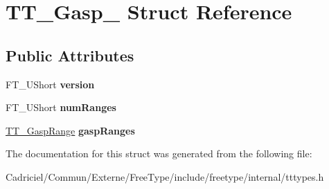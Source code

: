 \hypertarget{struct_t_t___gasp__}{\section{T\-T\-\_\-\-Gasp\-\_\- Struct Reference}
\label{struct_t_t___gasp__}
}
\subsection*{Public Attributes}
\begin{DoxyCompactItemize}
\item 
\hypertarget{struct_t_t___gasp___a0166777999a11a32068418ed6cf0caf8}{F\-T\-\_\-\-U\-Short {\bfseries version}}\label{struct_t_t___gasp___a0166777999a11a32068418ed6cf0caf8}

\item 
\hypertarget{struct_t_t___gasp___a03f6dc693ebee0fedc055ac0981ee776}{F\-T\-\_\-\-U\-Short {\bfseries num\-Ranges}}\label{struct_t_t___gasp___a03f6dc693ebee0fedc055ac0981ee776}

\item 
\hypertarget{struct_t_t___gasp___a50240e84cfd7fc79ae1f2996ecb2a5d1}{\hyperlink{struct_t_t___gasp_range_rec__}{T\-T\-\_\-\-Gasp\-Range} {\bfseries gasp\-Ranges}}\label{struct_t_t___gasp___a50240e84cfd7fc79ae1f2996ecb2a5d1}

\end{DoxyCompactItemize}


The documentation for this struct was generated from the following file\-:\begin{DoxyCompactItemize}
\item 
Cadriciel/\-Commun/\-Externe/\-Free\-Type/include/freetype/internal/tttypes.\-h\end{DoxyCompactItemize}
